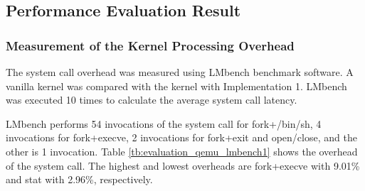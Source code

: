 

\subsection{Performance Evaluation Result}

\subsubsection{Measurement of the Kernel Processing Overhead}

The system call overhead was measured using LMbench benchmark software. 
%
A vanilla kernel was compared with the kernel with Implementation 1.
LMbench was executed 10 times to calculate the average system call latency.

LMbench performs 54 invocations of the system call for fork+/bin/sh, 4 invocations
for fork+execve, 2 invocations for fork+exit and open/close, and the other is 1
invocation.
Table \ref{tb:evaluation_qemu_lmbench1} shows the overhead of the system call. The
highest and lowest overheads are fork+execve with 9.01\% and stat with 2.96\%,
respectively.

